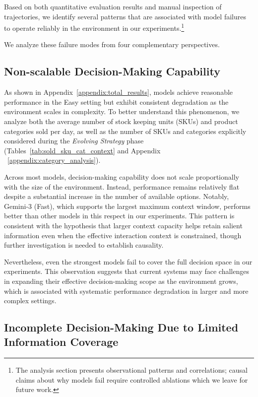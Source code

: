 
Based on both quantitative evaluation results and manual inspection of trajectories, we identify several patterns that are associated with model failures to operate reliably in the environment in our experiments.\footnote{The analysis section presents observational patterns and correlations; causal claims about why models fail require controlled ablations which we leave for future work.}

We analyze these failure modes from four complementary perspectives.

\subsection{Non-scalable Decision-Making Capability}




As shown in Appendix~\ref{appendix:total_results}, models achieve reasonable performance in the Easy setting but exhibit consistent degradation as the environment scales in complexity. To better understand this phenomenon, we analyze both the average number of stock keeping units (SKUs) and product categories sold per day, as well as the number of SKUs and categories explicitly considered during the \emph{Evolving Strategy} phase (Tables~\ref{tab:sold_sku_cat_context} and Appendix ~\ref{appendix:category_analysis}).

Across most models, decision-making capability does not scale proportionally with the size of the environment. Instead, performance remains relatively flat despite a substantial increase in the number of available options. Notably, Gemini-3 (Fast), which supports the largest maximum context window, performs better than other models in this respect in our experiments. This pattern is consistent with the hypothesis that larger context capacity helps retain salient information even when the effective interaction context is constrained, though further investigation is needed to establish causality.

Nevertheless, even the strongest models fail to cover the full decision space in our experiments. This observation suggests that current systems may face challenges in expanding their effective decision-making scope as the environment grows, which is associated with systematic performance degradation in larger and more complex settings.

\subsection{Incomplete Decision-Making Due to Limited Information Coverage}

